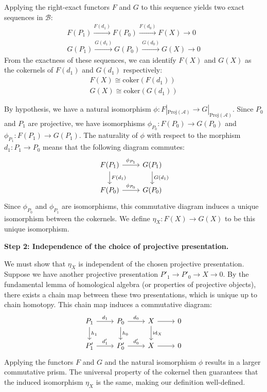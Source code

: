 \documentclass[11pt]{article}
\theoremstyle{definition}
\begin{document}
Applying the right-exact functors $F$ and $G$ to this sequence yields two exact sequences in $\mathcal{B}$:
\begin{align*}
F(P_1) \xrightarrow{F(d_1)} F(P_0) \xrightarrow{F(d_0)} F(X) \to 0 \\
G(P_1) \xrightarrow{G(d_1)} G(P_0) \xrightarrow{G(d_0)} G(X) \to 0
\end{align*}
From the exactness of these sequences, we can identify $F(X)$ and $G(X)$ as the cokernels of $F(d_1)$ and $G(d_1)$ respectively:
\begin{align*}
F(X) \cong \text{coker}(F(d_1)) \\
G(X) \cong \text{coker}(G(d_1))
\end{align*}

By hypothesis, we have a natural isomorphism $\phi: F|_{\text{Proj}(\mathcal{A})} \to G|_{\text{Proj}(\mathcal{A})}$. Since $P_0$ and $P_1$ are projective, we have isomorphisms $\phi_{P_0}: F(P_0) \to G(P_0)$ and $\phi_{P_1}: F(P_1) \to G(P_1)$. The naturality of $\phi$ with respect to the morphism $d_1: P_1 \to P_0$ means that the following diagram commutes:
\[
\begin{tikzcd}
F(P_1) \arrow{r}{\phi_{P_1}} \arrow{d}{F(d_1)} & G(P_1) \arrow{d}{G(d_1)} \\
F(P_0) \arrow{r}{\phi_{P_0}} & G(P_0)
\end{tikzcd}
\]
Since $\phi_{P_0}$ and $\phi_{P_1}$ are isomorphisms, this commutative diagram induces a unique isomorphism between the cokernels. We define $\eta_X: F(X) \to G(X)$ to be this unique isomorphism.

\textbf{Step 2: Independence of the choice of projective presentation.}

We must show that $\eta_X$ is independent of the chosen projective presentation. Suppose we have another projective presentation $P'_1 \to P'_0 \to X \to 0$. By the fundamental lemma of homological algebra (or properties of projective objects), there exists a chain map between these two presentations, which is unique up to chain homotopy. This chain map induces a commutative diagram:
\[
\begin{tikzcd}
P_1 \arrow{r}{d_1} \arrow{d}{h_1} & P_0 \arrow{r}{d_0} \arrow{d}{h_0} & X \arrow{r} \arrow{d}{\text{id}_X} & 0 \\
P'_1 \arrow{r}{d'_1} & P'_0 \arrow{r}{d'_0} & X \arrow{r} & 0
\end{tikzcd}
\]
Applying the functors $F$ and $G$ and the natural isomorphism $\phi$ results in a larger commutative prism. The universal property of the cokernel then guarantees that the induced isomorphism $\eta_X$ is the same, making our definition well-defined.
\end{document}
